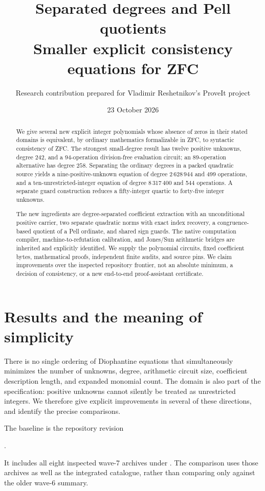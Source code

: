 \documentclass[11pt,a4paper]{article}
\title{Separated degrees and Pell quotients\\[4pt]
\large Smaller explicit consistency equations for ZFC}
\author{Research contribution prepared for Vladimir Reshetnikov's ProveIt project}
\date{23 October 2026}
\theoremstyle{definition}
\begin{document}
\maketitle
\begin{abstract}
We give several new explicit integer polynomials whose absence of zeros in
their stated domains is equivalent, by ordinary mathematics formalizable in
ZFC, to syntactic consistency of ZFC.  The strongest small-degree result has
twelve positive unknowns, degree \(242\), and a 94-operation division-free
evaluation circuit; an 89-operation alternative has degree \(258\).
Separating the ordinary degrees in a packed quadratic source yields a
nine-positive-unknown equation of degree \(2\,628\,944\) and 499 operations,
and a ten-unrestricted-integer equation of degree \(8\,317\,400\) and 544
operations.  A separate guard construction reduces a fifty-integer
quartic to forty-five integer unknowns.

The new ingredients are degree-separated coefficient extraction with an
unconditional positive carrier, two separate quadratic norms with exact
index recovery, a congruence-based quotient of a Pell ordinate, and shared
sign guards.  The native computation compiler, machine-to-refutation
calibration, and Jones/Sun arithmetic bridges are inherited and explicitly
identified.  We supply the polynomial circuits, fixed coefficient bytes,
mathematical proofs, independent finite audits, and source pins.  We claim
improvements over the inspected repository frontier, not an absolute
minimum, a decision of consistency, or a new end-to-end proof-assistant
certificate.
\end{abstract}

\section{Results and the meaning of simplicity}
\label{sec:results}

There is no single ordering of Diophantine equations that simultaneously
minimizes the number of unknowns, degree, arithmetic circuit size, coefficient
description length, and expanded monomial count.  The domain is also part
of the specification: positive unknowns cannot silently be treated as
unrestricted integers.  We therefore give explicit improvements in several
of these directions, and identify the precise comparisons.

The baseline is the repository revision
\begin{center}
.
\end{center}
It includes all eight inspected wave-7 archives under .
The comparison uses those archives as well as the integrated catalogue,
rather than comparing only against the older wave-6 summary.
\end{document}
